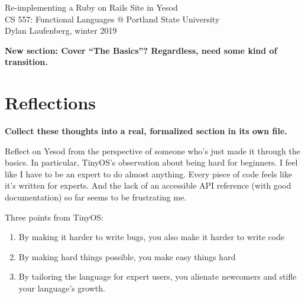 \documentclass{article}
\newcommand {\todo}[1] {{\textbf{\color{red}#1}}}
\begin{document}
\begin{center}
    \Huge Re-implementing a Ruby on Rails Site in Yesod \\
    \large CS 557: Functional Languages @ Portland State University \\
    Dylan Laufenberg, winter 2019
\end{center}



\todo{New section: Cover ``The Basics''? Regardless, need some kind of transition.}





\section{Reflections}

\todo{Collect these thoughts into a real, formalized section in its own file.}

Reflect on Yesod from the perspective of someone who's just made it through the basics. In particular, TinyOS's observation about being hard for beginners. I feel like I have to be an expert to do almost anything. Every piece of code feels like it's written for experts. And the lack of an accessible API reference (with good documentation) so far seems to be frustrating me.

Three points from TinyOS:
\begin{enumerate}
  \item By making it harder to write bugs, you also make it harder to write code
  \item By making hard things possible, you make easy things hard
  \item By tailoring the language for expert users, you alienate newcomers and stifle your language's growth.
\end{enumerate}

% 
% 
% 
% 

\printbibliography
\end{document}
